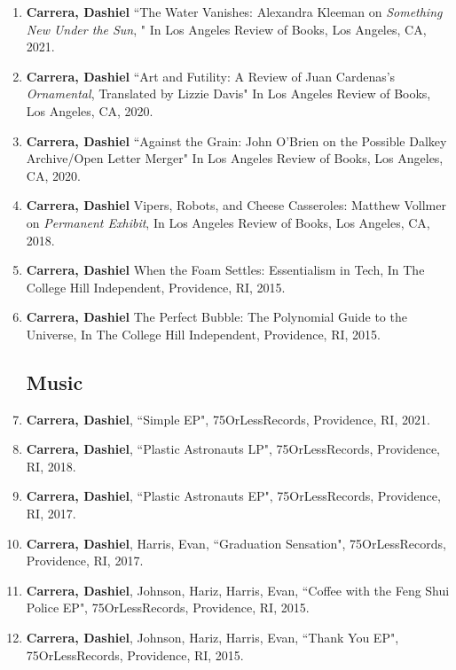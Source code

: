 \begin{enumerate}
\item \textbf{Carrera, Dashiel} ``The Water Vanishes: Alexandra Kleeman on \textit{Something New Under the Sun}, " In Los Angeles Review of Books, Los Angeles, CA, 2021.\\
\item \textbf{Carrera, Dashiel} ``Art and Futility: A Review of Juan Cardenas's \textit{Ornamental}, Translated by Lizzie Davis" In Los Angeles Review of Books, Los Angeles, CA, 2020.\\
\item \textbf{Carrera, Dashiel} ``Against the Grain: John O'Brien on the Possible Dalkey Archive/Open Letter Merger" In Los Angeles Review of Books, Los Angeles, CA, 2020. \\
\item \textbf{Carrera, Dashiel} Vipers, Robots, and Cheese Casseroles: Matthew Vollmer on \textit{Permanent Exhibit}, In Los Angeles Review of Books, Los Angeles, CA, 2018.\\
\item \textbf{Carrera, Dashiel} When the Foam Settles: Essentialism in Tech, In The College Hill Independent, Providence, RI, 2015.\\
\item \textbf{Carrera, Dashiel} The Perfect Bubble: The Polynomial Guide to the Universe, In The College Hill Independent, Providence, RI, 2015.\\

\subsection{Music}
\item \textbf{Carrera, Dashiel}, ``Simple EP", 75OrLessRecords, Providence, RI, 2021. \\
\item \textbf{Carrera, Dashiel}, ``Plastic Astronauts LP", 75OrLessRecords, Providence, RI, 2018. \\
\item \textbf{Carrera, Dashiel}, ``Plastic Astronauts EP", 75OrLessRecords, Providence, RI, 2017. \\
\item \textbf{Carrera, Dashiel}, Harris, Evan, ``Graduation Sensation", 75OrLessRecords, Providence, RI, 2017. \\
\item \textbf{Carrera, Dashiel}, Johnson, Hariz, Harris, Evan, ``Coffee with the Feng Shui Police EP", 75OrLessRecords, Providence, RI, 2015. \\
\item \textbf{Carrera, Dashiel}, Johnson, Hariz, Harris, Evan, ``Thank You EP", 75OrLessRecords, Providence, RI, 2015. \\

 \end{enumerate}